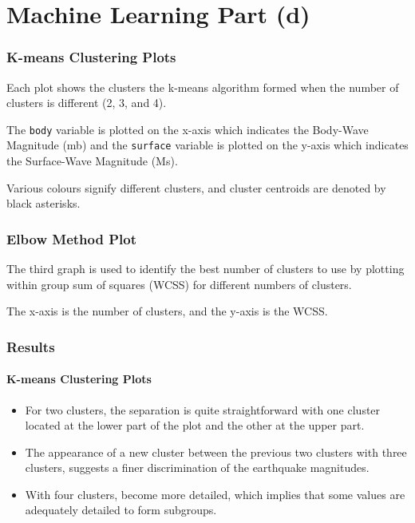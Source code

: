 \documentclass[
]{article}
\begin{document}
\section{Machine Learning Part (d)}\label{machine-learning-part-d}

\subsubsection{K-means Clustering Plots}\label{k-means-clustering-plots}

Each plot shows the clusters the k-means algorithm formed when the
number of clusters is different (2, 3, and 4).

The \texttt{body} variable is plotted on the x-axis which indicates the
Body-Wave Magnitude (mb) and the \texttt{surface} variable is plotted on
the y-axis which indicates the Surface-Wave Magnitude (Ms).

Various colours signify different clusters, and cluster centroids are
denoted by black asterisks.

\subsubsection{Elbow Method Plot}\label{elbow-method-plot}

The third graph is used to identify the best number of clusters to use
by plotting within group sum of squares (WCSS) for different numbers of
clusters.

The x-axis is the number of clusters, and the y-axis is the WCSS.

\subsubsection{Results}\label{results}

\paragraph{K-means Clustering Plots}\label{k-means-clustering-plots-1}

\begin{itemize}
\item
  For two clusters, the separation is quite straightforward with one
  cluster located at the lower part of the plot and the other at the
  upper part.
\item
  The appearance of a new cluster between the previous two clusters with
  three clusters, suggests a finer discrimination of the earthquake
  magnitudes.
\item
  With four clusters, become more detailed, which implies that some
  values are adequately detailed to form subgroups.
\end{itemize}
\end{document}
